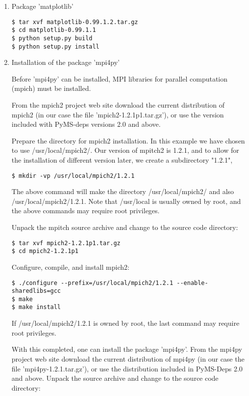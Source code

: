\begin{enumerate}

\item Package 'matplotlib'

\begin{verbatim}
$ tar xvf matplotlib-0.99.1.2.tar.gz
$ cd matplotlib-0.99.1.1  
$ python setup.py build   
$ python setup.py install
\end{verbatim}

\item Installation of the package 'mpi4py'

Before 'mpi4py' can be installed, MPI libraries for parallel computation
(mpich) must be installed.

From the mpich2 project web site download the current distribution of mpich2
(in our case the file 'mpich2-1.2.1p1.tar.gz'), or use the version included
with PyMS-deps versions 2.0 and above.

Prepare the directory for mpich2 installation. In this example we have chosen
to use /usr/local/mpich2/. Our version of mpitch2 is 1.2.1, and to allow for
the installation of different version later, we create a subdirectory "1.2.1",

\begin{verbatim}
$ mkdir -vp /usr/local/mpich2/1.2.1
\end{verbatim}

The above command will make the directory /usr/local/mpich2/ and also
/usr/local/mpich2/1.2.1. Note that /usr/local is usually owned by root,
and the above commands may require root privileges.

Unpack the mpitch source archive and change to the source code directory:

\begin{verbatim}
$ tar xvf mpich2-1.2.1p1.tar.gz 
$ cd mpich2-1.2.1p1
\end{verbatim}

Configure, compile, and install mpich2:

\begin{verbatim}
$ ./configure --prefix=/usr/local/mpich2/1.2.1 --enable-sharedlibs=gcc
$ make
$ make install
\end{verbatim}

If /usr/local/mpich2/1.2.1 is owned by root, the last command may require
root privileges.

With this completed, one can install the package 'mpi4py'. From the mpi4py
project web site download the current distribution of mpi4py (in our case
the file 'mpi4py-1.2.1.tar.gz'), or use the distribution included in
PyMS-Deps 2.0 and above.  Unpack the source archive and change to the
source code directory:


\end{enumerate}
